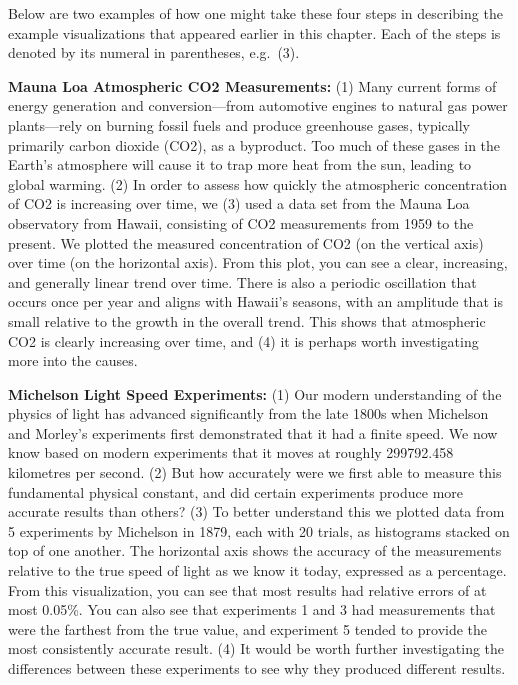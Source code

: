 \documentclass[
]{krantz}
\begin{document}
Below are two examples of how one might take these four steps in describing the example visualizations that appeared earlier in this chapter.
Each of the steps is denoted by its numeral in parentheses, e.g.~(3).

\textbf{Mauna Loa Atmospheric CO2 Measurements:} (1) Many current forms of energy generation and conversion---from automotive engines to natural gas power plants---rely on burning
fossil fuels and produce greenhouse gases, typically primarily carbon dioxide (CO2), as a byproduct. Too much of these gases in the Earth's atmosphere will cause it to trap
more heat from the sun, leading to global warming. (2) In order to assess how quickly the atmospheric concentration of CO2 is increasing over time, we (3) used a data set from
the Mauna Loa observatory from Hawaii, consisting of CO2 measurements from 1959 to the present. We plotted the measured concentration of CO2 (on the vertical axis) over time
(on the horizontal axis). From this plot, you can see a clear, increasing, and generally linear trend over time. There is also a periodic oscillation that occurs once per year and
aligns with Hawaii's seasons, with an amplitude that is small relative to the growth in the overall trend. This shows that atmospheric CO2 is clearly increasing over
time, and (4) it is perhaps worth investigating more into the causes.

\textbf{Michelson Light Speed Experiments:} (1) Our modern understanding of the physics of light has advanced significantly from the
late 1800s when Michelson and Morley's experiments first demonstrated that it had a finite speed. We now know based on modern experiments that it
moves at roughly 299792.458 kilometres per second. (2) But how accurately were we first able to measure this fundamental physical constant, and did certain
experiments produce more accurate results than others?
(3) To better understand this we plotted data from 5 experiments by Michelson in 1879, each with 20 trials, as histograms stacked on top of one another.
The horizontal axis shows the accuracy of the measurements relative to the true speed of light as we know it today, expressed as a percentage.
From this visualization, you can see that most results had relative errors of at most 0.05\%. You can also see that experiments 1 and 3 had
measurements that were the farthest from the true value, and experiment 5 tended to provide the most consistently accurate result. (4) It would be
worth further investigating the differences between these experiments to see why they produced different results.
\end{document}
